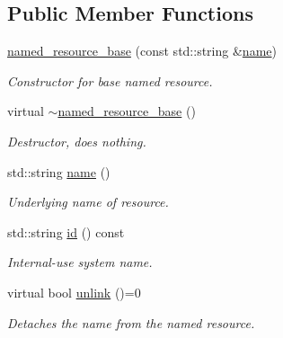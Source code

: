 \subsection*{Public Member Functions}
\begin{DoxyCompactItemize}
\item 
\hyperlink{classcpen333_1_1process_1_1impl_1_1named__resource__base_a5f6f8b6daec88189a041de4c60ad4518}{named\+\_\+resource\+\_\+base} (const std\+::string \&\hyperlink{classcpen333_1_1process_1_1impl_1_1named__resource__base_a53986a0a1dd26a3602b842c45613b79d}{name})
\begin{DoxyCompactList}\small\item\em Constructor for base named resource. \end{DoxyCompactList}\item 
\mbox{\label{classcpen333_1_1process_1_1impl_1_1named__resource__base_ae53d159d6c0d58a37ce8091aa132e11b}} 
virtual \hyperlink{classcpen333_1_1process_1_1impl_1_1named__resource__base_ae53d159d6c0d58a37ce8091aa132e11b}{$\sim$named\+\_\+resource\+\_\+base} ()
\begin{DoxyCompactList}\small\item\em Destructor, does nothing. \end{DoxyCompactList}\item 
std\+::string \hyperlink{classcpen333_1_1process_1_1impl_1_1named__resource__base_a53986a0a1dd26a3602b842c45613b79d}{name} ()
\begin{DoxyCompactList}\small\item\em Underlying name of resource. \end{DoxyCompactList}\item 
std\+::string \hyperlink{classcpen333_1_1process_1_1impl_1_1named__resource__base_abc636f266fcae871cec3861a90991898}{id} () const
\begin{DoxyCompactList}\small\item\em Internal-\/use system name. \end{DoxyCompactList}\item 
virtual bool \hyperlink{classcpen333_1_1process_1_1impl_1_1named__resource__base_ae4033f82dfd068b917a9bca57d3a0c45}{unlink} ()=0
\begin{DoxyCompactList}\small\item\em Detaches the name from the named resource. \end{DoxyCompactList}\end{DoxyCompactItemize}
